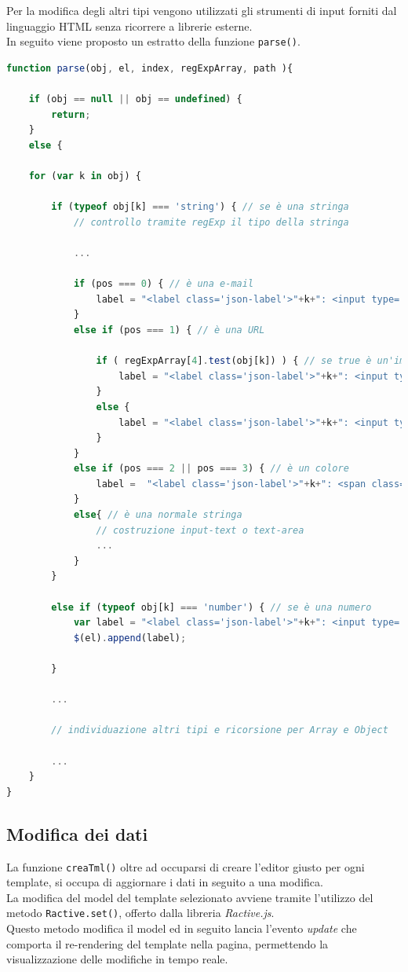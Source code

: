 \newpage
Per la modifica degli altri tipi vengono utilizzati gli strumenti di input forniti dal linguaggio HTML senza ricorrere a librerie esterne.\\
In seguito viene proposto un estratto della funzione \texttt{parse()}.
\begin{lstlisting}[language=JavaScript, caption=Estratto della funzione \texttt{parse()}]
function parse(obj, el, index, regExpArray, path ){

	if (obj == null || obj == undefined) {
		return;
	}
	else {

	for (var k in obj) {

		if (typeof obj[k] === 'string') { // se è una stringa
			// controllo tramite regExp il tipo della stringa
			
			...

			if (pos === 0) { // è una e-mail
				label = "<label class='json-label'>"+k+": <input type='text' class='json-data-email edit' id='"+path+k+"' value='"+obj[k]+"' ></label><br>";
			}
			else if (pos === 1) { // è una URL
			
				if ( regExpArray[4].test(obj[k]) ) { // se true è un'immagine
					label = "<label class='json-label'>"+k+": <input type='file' class='json-data-img edit' id='"+path+k+"' ></label><br>";
				}
				else {
					label = "<label class='json-label'>"+k+": <input type='text' class='json-data-url edit' id='"+path+k+"' value='"+obj[k]+"' ></label><br>";
				}  
			}
			else if (pos === 2 || pos === 3) { // è un colore
				label =  "<label class='json-label'>"+k+": <span class='pick-color'>pick a color >> <input class='json-data-color jscolor edit' id='"+path+k+"' value='"+obj[k]+"'></span></label><br>";
			}
			else{ // è una normale stringa
				// costruzione input-text o text-area
				...
			}
		}

		else if (typeof obj[k] === 'number') { // se è una numero
			var label = "<label class='json-label'>"+k+": <input type='number' class='json-data-number edit' id='"+path+k+"' value='"+obj[k]+"' ></label><br>";
			$(el).append(label);
		
		}
		
		...
		
		// individuazione altri tipi e ricorsione per Array e Object
		
		...
	}
}
\end{lstlisting}

\subsection{Modifica dei dati}
La funzione \texttt{creaTml()} oltre ad occuparsi di creare l'editor giusto per ogni template, si occupa di aggiornare i dati in seguito a una modifica.\\
La modifica del model del template selezionato avviene tramite l'utilizzo del metodo \texttt{Ractive.set()}, offerto dalla libreria \textit{Ractive.js}.\\
Questo metodo modifica il model ed in seguito lancia l'evento \textit{update} che comporta il re-rendering del template nella pagina, permettendo la visualizzazione delle modifiche in tempo reale.\\

